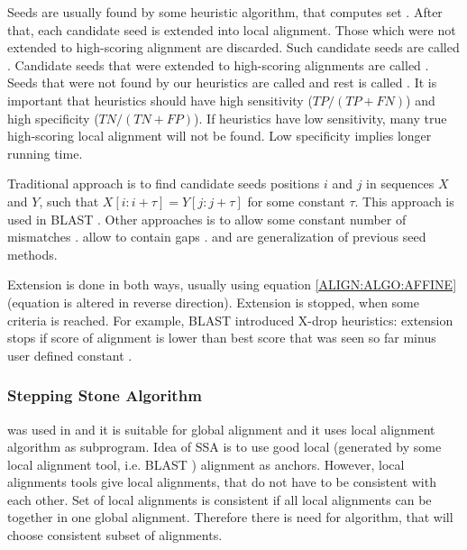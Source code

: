 Seeds are usually found by some heuristic algorithm, that computes set
. After that, each candidate seed is extended into
local alignment. Those which were not extended to high-scoring alignment are
discarded. Such candidate seeds are called .
Candidate seeds that were extended to high-scoring alignments are called
.  Seeds that were not found by our heuristics
are called  and rest is called
. It is important that heuristics should have
high sensitivity ($TP/(TP+FN)$) and high specificity ($TN/(TN+FP)$). If
heuristics have low sensitivity, many true high-scoring local alignment will not
be found. Low specificity implies longer running time. 

Traditional approach is to find candidate seeds positions $i$ and $j$ in
sequences $X$ and $Y$, such that $X[i:i+\tau]=Y[j:j+\tau]$ for some constant
$\tau$. This approach is used in BLAST \cite{}. Other approaches is to allow some
constant number of mismatches \cite{}.  allow to
contain gaps \cite{}.  \cite{} and  \cite{Csuros2005} are generalization of previous seed methods.

Extension is done in both ways, usually using equation \ref{ALIGN:ALGO:AFFINE}
(equation is altered in reverse direction). Extension is stopped, when some
criteria is reached. For example, BLAST introduced X-drop heuristics: extension stops
if score of alignment is lower than best score that was seen so far minus user
defined constant \cite{}.


\subsubsection{Stepping Stone Algorithm}

 was used in
\cite{Meyer2002,Pairagon2009} and it is
suitable for global alignment and it uses local alignment algorithm as
subprogram. Idea of SSA is to use good local (generated by some local alignment
tool, i.e. BLAST \cite{}) alignment as anchors. However, local alignments tools 
give local alignments, that do not have to be consistent with each other. Set of 
local alignments is consistent if all local alignments can be together in one global
alignment. Therefore there is need for algorithm, that will choose consistent
subset of alignments.

